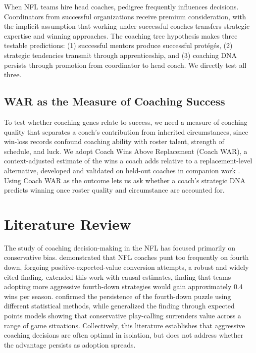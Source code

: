 \documentclass[USenglish]{article}
\theoremstyle{dgthm}
\theoremstyle{dgdef}
\begin{document}
When NFL teams hire head coaches, pedigree frequently influences decisions. Coordinators from successful organizations receive premium consideration, with the implicit assumption that working under successful coaches transfers strategic expertise and winning approaches. The coaching tree hypothesis makes three testable predictions: (1) successful mentors produce successful prot\'{e}g\'{e}s, (2) strategic tendencies transmit through apprenticeship, and (3) coaching DNA persists through promotion from coordinator to head coach. We directly test all three.

\subsection{WAR as the Measure of Coaching Success}

To test whether coaching genes relate to success, we need a measure of coaching quality that separates a coach's contribution from inherited circumstances, since win-loss records confound coaching ability with roster talent, strength of schedule, and luck. We adopt Coach Wins Above Replacement (Coach WAR), a context-adjusted estimate of the wins a coach adds relative to a replacement-level alternative, developed and validated on held-out coaches in companion work \citep{williamson2026war}. Using Coach WAR as the outcome lets us ask whether a coach's strategic DNA predicts winning once roster quality and circumstance are accounted for.

\section{Literature Review}

The study of coaching decision-making in the NFL has focused primarily on conservative bias. \citet{romer2006} demonstrated that NFL coaches punt too frequently on fourth down, forgoing positive-expected-value conversion attempts, a robust and widely cited finding. \citet{yam2019} extended this work with causal estimates, finding that teams adopting more aggressive fourth-down strategies would gain approximately 0.4 wins per season. \citet{horowitz2014} confirmed the persistence of the fourth-down puzzle using different statistical methods, while \citet{burke2009} generalized the finding through expected points models showing that conservative play-calling surrenders value across a range of game situations. Collectively, this literature establishes that aggressive coaching decisions are often optimal in isolation, but does not address whether the advantage persists as adoption spreads.
\end{document}
